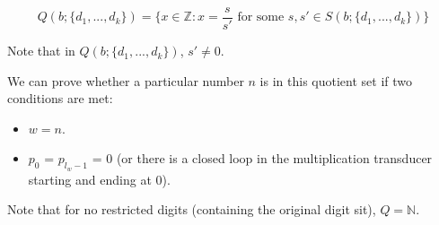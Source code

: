 \documentclass{article}
\begin{document}
\begin{equation} Q (b; \{d_1, ..., d_k\}) = \{x \in \mathbb{Z}: x = \frac{s}{s'} \text{ for some } s, s' \in S(b; \{d_1, ..., d_k\})\}\end{equation}

Note that in $Q (b; \{d_1, ..., d_k\})$, $s' \neq 0$. \vspace{\baselineskip}

We can prove whether a particular number $n$ is in this quotient set if two conditions are met: 

\begin{itemize}
  \item $w = n$.
  \item $p_0$ = $p_{l_{w}-1}$ = $0$ (or there is a closed loop in the multiplication transducer starting and ending at 0).
\end{itemize}

Note that for no restricted digits (containing the original digit sit), $Q = \mathbb{N}$.

\printbibliography
\end{document}
